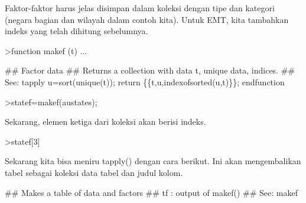 \documentclass[12pt,arial,letterpaper]{book}
\begin{document}
\begin{eulercomment}
\begin{eulercomment}
\begin{eulercomment}
\begin{eulercomment}
\begin{eulercomment}
\begin{eulercomment}
\begin{eulercomment}
\begin{eulercomment}
\begin{eulercomment}
\begin{eulercomment}
\begin{eulercomment}
\begin{eulercomment}
\begin{eulercomment}
\begin{eulercomment}
\begin{eulercomment}
\begin{eulercomment}
\begin{eulercomment}
\begin{eulercomment}
\begin{eulercomment}
\begin{eulercomment}
\begin{eulercomment}
\begin{eulercomment}
\begin{eulercomment}
\begin{eulercomment}
\begin{eulercomment}
\begin{eulercomment}
\begin{eulercomment}
\begin{eulercomment}
\begin{eulercomment}
\begin{eulercomment}
\begin{eulercomment}
\begin{eulercomment}
\begin{eulercomment}
\begin{eulercomment}
\begin{eulercomment}
\begin{eulercomment}
\begin{eulercomment}
Faktor-faktor harus jelas disimpan dalam koleksi dengan tipe dan
kategori (negara bagian dan wilayah dalam contoh kita). Untuk EMT,
kita tambahkan indeks yang telah dihitung sebelumnya.
\end{eulercomment}
\begin{eulerprompt}
>function makef (t) ...
\end{eulerprompt}
\begin{eulerudf}
  ## Factor data
  ## Returns a collection with data t, unique data, indices.
  ## See: tapply
  u=sort(unique(t));
  return \{\{t,u,indexofsorted(u,t)\}\};
  endfunction
\end{eulerudf}
\begin{eulerprompt}
>statef=makef(austates);
\end{eulerprompt}
\begin{eulercomment}
Sekarang, elemen ketiga dari koleksi akan berisi indeks.
\end{eulercomment}
\begin{eulerprompt}
>statef[3]
\end{eulerprompt}
\begin{euleroutput}
  [6,  5,  4,  2,  2,  3,  8,  8,  4,  7,  2,  7,  4,  4,  5,  6,  5,  3,
  8,  7,  4,  2,  2,  8,  5,  1,  2,  7,  7,  1]
\end{euleroutput}
\begin{eulercomment}
Sekarang kita bisa meniru tapply() dengan cara berikut. Ini akan
mengembalikan tabel sebagai koleksi data tabel dan judul kolom.
\end{eulercomment}
\begin{eulerudf}
  ## Makes a table of data and factors
  ## tf : output of makef()
  ## See: makef

\end{eulerudf}
\end{eulercomment}
\end{eulercomment}
\end{eulercomment}
\end{eulercomment}
\end{eulercomment}
\end{eulercomment}
\end{eulercomment}
\end{eulercomment}
\end{eulercomment}
\end{eulercomment}
\end{eulercomment}
\end{eulercomment}
\end{eulercomment}
\end{eulercomment}
\end{eulercomment}
\end{eulercomment}
\end{eulercomment}
\end{eulercomment}
\end{eulercomment}
\end{eulercomment}
\end{eulercomment}
\end{eulercomment}
\end{eulercomment}
\end{eulercomment}
\end{eulercomment}
\end{eulercomment}
\end{eulercomment}
\end{eulercomment}
\end{eulercomment}
\end{eulercomment}
\end{eulercomment}
\end{eulercomment}
\end{eulercomment}
\end{eulercomment}
\end{eulercomment}
\end{eulercomment}
\end{document}
